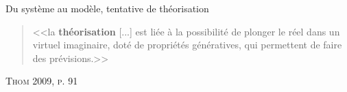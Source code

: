 \documentclass[newPxFont]{beamer}
\begin{document}
\begin{frame}[c]{Du système au modèle, tentative de théorisation}
  \vspace{-1em}
  \begin{quote}
    <<la \textbf{théorisation} [...] est liée à la possibilité de plonger le réel dans un virtuel imaginaire, doté de propriétés génératives, qui permettent de faire des prévisions.>>
  \end{quote}
  \hspace*{\fill}\textsc{Thom 2009, p. 91}
  \vspace{-0.5em}
  \begin{figure}
   	\centering
   		\hspace{0.2em} %
      \hspace{0.2em} %
   		\hspace{0.2em} %
  \end{figure}
\end{frame}
\end{document}

